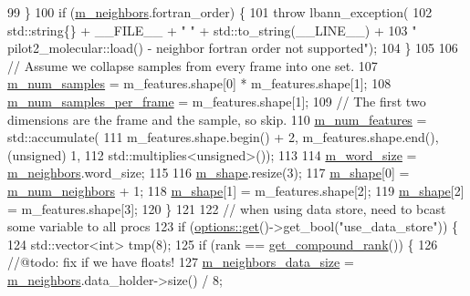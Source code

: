 \begin{DoxyCode}
99     \}
100     \textcolor{keywordflow}{if} (\hyperlink{classlbann_1_1pilot2__molecular__reader_a0d8dc24b8ea66352a4d45a157b3a3c04}{m\_neighbors}.fortran\_order) \{
101       \textcolor{keywordflow}{throw} lbann\_exception(
102         std::string\{\} + \_\_FILE\_\_ + \textcolor{stringliteral}{" "} + std::to\_string(\_\_LINE\_\_) +
103         \textcolor{stringliteral}{" pilot2\_molecular::load() - neighbor fortran order not supported"});
104     \}
105   
106     \textcolor{comment}{// Assume we collapse samples from every frame into one set.}
107     \hyperlink{classlbann_1_1pilot2__molecular__reader_a9db4542fcce68a2a60ad5aad9d211dee}{m\_num\_samples} = m\_features.shape[0] * m\_features.shape[1];
108     \hyperlink{classlbann_1_1pilot2__molecular__reader_a1aa5896276d8a0576f7b3c2b955130be}{m\_num\_samples\_per\_frame} = m\_features.shape[1];
109     \textcolor{comment}{// The first two dimensions are the frame and the sample, so skip.}
110     \hyperlink{classlbann_1_1pilot2__molecular__reader_a7fd7dac6f280fd8ef92bd5d2ffc89e36}{m\_num\_features} = std::accumulate(
111       m\_features.shape.begin() + 2, m\_features.shape.end(), (unsigned) 1,
112       std::multiplies<unsigned>());
113 
114     \hyperlink{classlbann_1_1pilot2__molecular__reader_a1093a0518b7913c91e9b36679b198948}{m\_word\_size} = \hyperlink{classlbann_1_1pilot2__molecular__reader_a0d8dc24b8ea66352a4d45a157b3a3c04}{m\_neighbors}.word\_size;
115 
116     \hyperlink{classlbann_1_1pilot2__molecular__reader_ae02769bc68f1e079c740f724ec6bd0c0}{m\_shape}.resize(3);
117     \hyperlink{classlbann_1_1pilot2__molecular__reader_ae02769bc68f1e079c740f724ec6bd0c0}{m\_shape}[0] = \hyperlink{classlbann_1_1pilot2__molecular__reader_aaf41323e4da85467de398b4ab4b58c2c}{m\_num\_neighbors} + 1;
118     \hyperlink{classlbann_1_1pilot2__molecular__reader_ae02769bc68f1e079c740f724ec6bd0c0}{m\_shape}[1] = m\_features.shape[2];
119     \hyperlink{classlbann_1_1pilot2__molecular__reader_ae02769bc68f1e079c740f724ec6bd0c0}{m\_shape}[2] = m\_features.shape[3];
120   \}
121 
122   \textcolor{comment}{// when using data store, need to bcast some variable to all procs}
123   \textcolor{keywordflow}{if} (\hyperlink{classoptions_a9ecfe9c365269df68a41b961c31ae3f5}{options::get}()->get\_bool(\textcolor{stringliteral}{"use\_data\_store"})) \{
124     std::vector<int> tmp(8);
125     \textcolor{keywordflow}{if} (rank == \hyperlink{classlbann_1_1generic__data__reader_ac4fc0729e7f1240e167fe897df99f950}{get\_compound\_rank}()) \{
126       \textcolor{comment}{//@todo: fix if we have floats!}
127       \hyperlink{classlbann_1_1pilot2__molecular__reader_a0d61b0b65b1998694272a5d2173cbac7}{m\_neighbors\_data\_size} = \hyperlink{classlbann_1_1pilot2__molecular__reader_a0d8dc24b8ea66352a4d45a157b3a3c04}{m\_neighbors}.data\_holder->size() / 8;

\end{DoxyCode}
